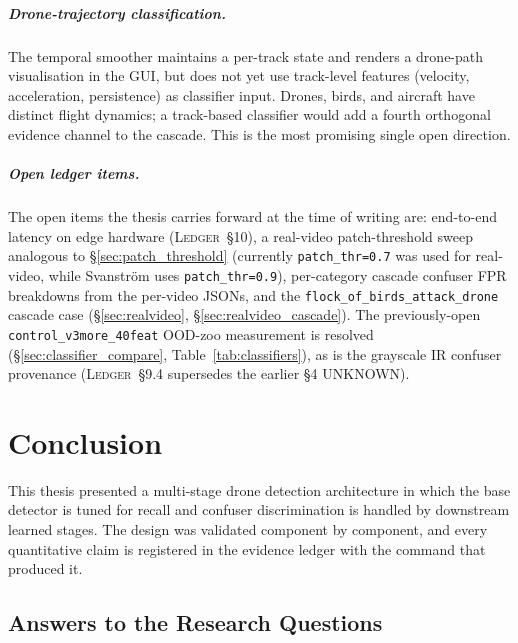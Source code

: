\documentclass[12pt,a4paper,oneside,openright]{book}
\begin{document}
\paragraph{Drone-trajectory classification.}
The temporal smoother maintains a per-track state and renders a drone-path visualisation in the GUI, but does not yet use track-level features (velocity, acceleration, persistence) as classifier input. Drones, birds, and aircraft have distinct flight dynamics; a track-based classifier would add a fourth orthogonal evidence channel to the cascade. This is the most promising single open direction.

\paragraph{Open ledger items.}
The open items the thesis carries forward at the time of writing are: end-to-end latency on edge hardware (\textsc{Ledger}~\S10), a real-video patch-threshold sweep analogous to \S\ref{sec:patch_threshold} (currently \texttt{patch\_thr=0.7} was used for real-video, while Svanstr\"om uses \texttt{patch\_thr=0.9}), per-category cascade confuser FPR breakdowns from the per-video JSONs, and the \texttt{flock\_of\_birds\_attack\_drone} cascade case (\S\ref{sec:realvideo}, \S\ref{sec:realvideo_cascade}). The previously-open \texttt{control\_v3more\_40feat} OOD-zoo measurement is resolved (\S\ref{sec:classifier_compare}, Table~\ref{tab:classifiers}), as is the grayscale IR confuser provenance (\textsc{Ledger}~\S9.4 supersedes the earlier \S4 UNKNOWN).

\chapter{Conclusion}
\label{ch:conclusion}

This thesis presented a multi-stage drone detection architecture in which the base detector is tuned for recall and confuser discrimination is handled by downstream learned stages. The design was validated component by component, and every quantitative claim is registered in the evidence ledger with the command that produced it.

\section{Answers to the Research Questions}
\label{sec:rq_answers}
\end{document}

